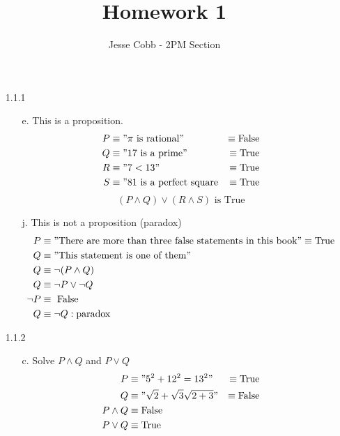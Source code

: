 \documentclass[11pt]{amsart}
\theoremstyle{definition}
\begin{document}
\title{Homework 1}

\author{Jesse Cobb - 2PM Section}

\maketitle

\begin{itemize}

\item[1.1.1]
\begin{itemize}

    \item[e.] This is a proposition.
    \begin{align*}
        P &\equiv "\pi \text{ is rational}" &\equiv \text{False} \\
        Q &\equiv "17 \text{ is a prime}" &\equiv \text{True}\\
        R &\equiv "7 < 13" &\equiv \text{True} \\
        S &\equiv "81 \text{ is a perfect square} &\equiv \text{True} 
    \end{align*}
    \begin{equation*}
        (P \land Q) \lor (R \land S) \text{ is True}
    \end{equation*}

    \item[j.] This is not a proposition (paradox)
    \begin{align*}
        P &\equiv "\text{There are more than three false statements in this book}" \equiv \text{True}\\
        Q &\equiv "\text{This statement is one of them}" \\
        Q &\equiv \neg(P \land Q) \\
        Q &\equiv \neg P \lor \neg Q \\
        \neg P &\equiv \text{ False} \\
        Q &\equiv \neg Q : \text{paradox}
    \end{align*}
    
\end{itemize}

\item[1.1.2]
\begin{itemize}

    \item[c.] Solve $P \land Q$ and $P \lor Q$
    \begin{align*}
        P &\equiv "5^2+12^2=13^2" &\equiv \text{True}\\
        Q &\equiv "\sqrt{2}+\sqrt{3}\sqrt{2+3}" &\equiv \text{False} \\
        P \land Q &\equiv \text{False} \\
        P \lor Q &\equiv \text{True}
    \end{align*}
    

\end{itemize}
\end{itemize}
\end{document}
